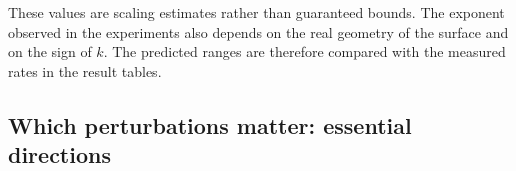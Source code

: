 \documentclass[12pt, a4paper]{article}
\theoremstyle{plain}
\theoremstyle{definition}
\theoremstyle{remark}
\theoremstyle{definition}
\begin{document}
These values are scaling estimates rather than guaranteed bounds.
The exponent observed in the experiments also depends on the real
geometry of the surface and on the sign of $k$. The predicted ranges
are therefore compared with the measured rates in the result tables.

\subsection{Which perturbations matter: essential directions}
\end{document}
